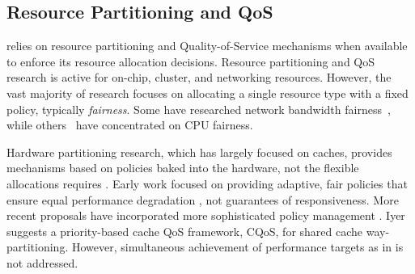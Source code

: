 %

\subsection{Resource Partitioning and QoS}
\label{sec:rel:pm}

\pacora relies on resource partitioning and Quality-of-Service mechanisms when available to enforce its resource allocation decisions.  Resource partitioning and QoS research is active for on-chip, cluster, and networking resources.  However, the vast majority of research focuses on allocating a single resource type with a fixed policy, typically \emph{fairness}.
Some have researched network bandwidth fairness~\cite{Blanquer, Kleinberg99fairnessin, Liu}, while others~\cite{Baruah96proportionateprogress, Baruah_fastscheduling, Zhu} have concentrated on CPU fairness.

Hardware partitioning research, which has largely focused on caches, provides mechanisms based on policies baked into the hardware, not the flexible allocations \pacora requires \cite{876484, 967444,1194855,1275005,1194858,1318096,1088154,1399973,1069998,1399982}.  Early work focused on providing adaptive, fair policies that ensure equal performance degradation \cite{605420,1086328}, not guarantees of responsiveness. More recent proposals have incorporated more sophisticated policy management \cite{1241608,1331730,1152161,1254886}. Iyer\cite{1006246} suggests a priority-based cache QoS framework, CQoS, for shared cache way-partitioning.
However, simultaneous achievement of performance targets as in \pacora is not addressed.





